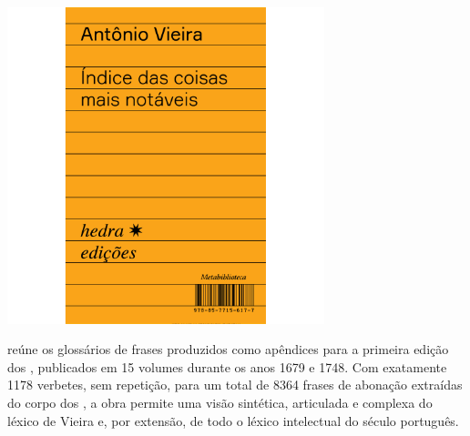 \hspace*{-.4cm}\begin{minipage}[c]{.5\linewidth}
\small{
{}}
\end{minipage}

\pagebreak

\hspace{.5cm}

\begin{center}
\hspace*{-2.5cm}
\hspace*{2.5cm}\includegraphics[width=92mm]{./grid/vieira.jpg}
\end{center}

\hspace*{-7cm}\hrulefill\hspace*{-7cm}

\medskip

 reúne os glossários de frases produzidos como apêndices para a primeira edição dos {}, publicados em 15
volumes durante os anos 1679 e 1748. Com exatamente 1178 verbetes,
sem repetição, para um total de 8364 frases de abonação extraídas do corpo dos
{}, a obra permite uma visão sintética, articulada e complexa do léxico de
Vieira e, por extensão, de todo o léxico intelectual do século 
português.

